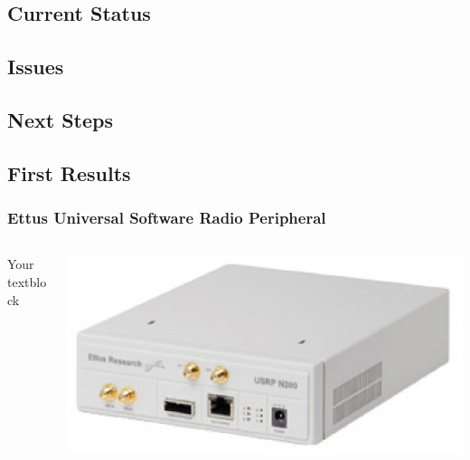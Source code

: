 \documentclass{beamer}
\begin{document}
\subsection{Current Status}

\subsection{Issues}

\subsection{Next Steps}

\subsection{First Results}

\begin{frame}
\frametitle{Ettus Universal Software Radio Peripheral}
  \begin{columns}[T]
    \begin{column}{.5\textwidth}
     \begin{block}{Your textblock}
    \end{block}
    \end{column}
    \begin{column}{.5\textwidth}
    \begin{block}{}
    \includegraphics[width=\textwidth]{n200.eps}
    \end{block}
    \end{column}
  \end{columns}
\end{frame}
\end{document}
